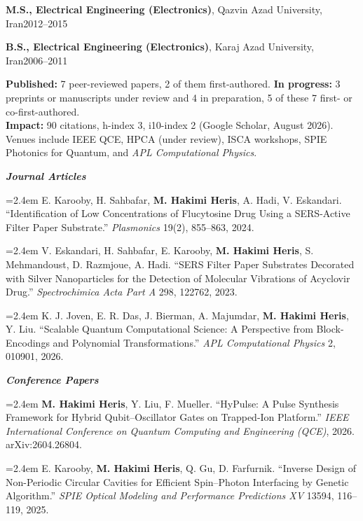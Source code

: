 \documentclass[10.5pt,letterpaper]{article}
\newcommand{\cvsec}[1]{%
  \par\needspace{4\baselineskip}\vspace{11pt}%
  \noindent\makebox[0pt][r]{%
    \smash{\parbox[t]{1.45in}{\raggedright\footnotesize\bfseries\MakeUppercase{#1}}}%
    \hspace{0.30in}}%
  \ignorespaces}
\newcommand{\cvsub}[1]{\par\vspace{7pt}\textbf{\itshape #1}\par\vspace{2pt}}
\newcommand{\entry}[2]{#1\hfill #2\par}
\newcommand{\pub}[2]{%
  \par\vspace{4pt}\noindent
  \begingroup\hangindent=2.4em\hangafter=1
  \makebox[2.4em][l]{[#1]}#2\par\endgroup}
\newcommand{\me}{\textbf{M. Hakimi Heris}}
\begin{document}
\vspace{5pt}
\entry{\textbf{M.S., Electrical Engineering (Electronics)}, Qazvin Azad University, Iran}{2012--2015}
\entry{\textbf{B.S., Electrical Engineering (Electronics)}, Karaj Azad University, Iran}{2006--2011}

\cvsec{Publication\\Summary}
\textbf{Published:} 7 peer-reviewed papers, 2 of them first-authored.
\textbf{In progress:} 3 preprints or manuscripts under review and 4 in preparation,
5 of these 7 first- or co-first-authored.\\
\textbf{Impact:} 90 citations, h-index 3, i10-index 2 (Google Scholar, August 2026).\\
Venues include IEEE QCE, HPCA (under review), ISCA workshops, SPIE Photonics for Quantum,
and \emph{APL Computational Physics}.

\cvsec{Peer-Reviewed\\Publications}
\cvsub{Journal Articles}

\pub{J3}{E. Karooby, H. Sahbafar, \me, A. Hadi, V. Eskandari.
``Identification of Low Concentrations of Flucytosine Drug Using a SERS-Active Filter
Paper Substrate.'' \emph{Plasmonics} 19(2), 855--863, 2024.}

\pub{J2}{V. Eskandari, H. Sahbafar, E. Karooby, \me, S. Mehmandoust, D. Razmjoue, A. Hadi.
``SERS Filter Paper Substrates Decorated with Silver Nanoparticles for the Detection of
Molecular Vibrations of Acyclovir Drug.''
\emph{Spectrochimica Acta Part A} 298, 122762, 2023.}

\pub{J1}{K. J. Joven, E. R. Das, J. Bierman, A. Majumdar, \me, Y. Liu.
``Scalable Quantum Computational Science: A Perspective from Block-Encodings and
Polynomial Transformations.'' \emph{APL Computational Physics} 2, 010901, 2026.}

\cvsub{Conference Papers}

\pub{C4}{\me, Y. Liu, F. Mueller.
``HyPulse: A Pulse Synthesis Framework for Hybrid Qubit--Oscillator Gates on Trapped-Ion
Platform.'' \emph{IEEE International Conference on Quantum Computing and Engineering
(QCE)}, 2026. arXiv:2604.26804.}

\pub{C3}{E. Karooby, \me, Q. Gu, D. Farfurnik.
``Inverse Design of Non-Periodic Circular Cavities for Efficient Spin--Photon Interfacing
by Genetic Algorithm.'' \emph{SPIE Optical Modeling and Performance Predictions XV}
13594, 116--119, 2025.}
\end{document}
